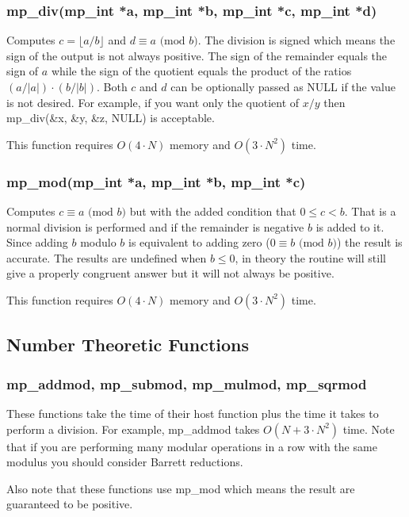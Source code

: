 \documentclass{article}
\begin{document}
\subsubsection{mp\_div(mp\_int *a, mp\_int *b, mp\_int *c, mp\_int *d)}
Computes $c = \lfloor a/b \rfloor$ and $d \equiv a \mbox{ (mod }b\mbox{)}$.  The division is signed which means the sign
of the output is not always positive.  The sign of the remainder equals the sign of $a$ while the sign of the 
quotient equals the product of the ratios $(a/\vert a \vert) \cdot (b/\vert b \vert)$.  Both $c$ and $d$ can be 
optionally passed as NULL if the value is not desired.  For example, if you want only the quotient of $x/y$ then 
mp\_div(\&x, \&y, \&z, NULL) is acceptable.

This function requires $O(4 \cdot N)$ memory and $O(3 \cdot N^2)$ time.

\subsubsection{mp\_mod(mp\_int *a, mp\_int *b, mp\_int *c)}
Computes $c \equiv a \mbox{ (mod }b\mbox{)}$ but with the added condition that $0 \le c < b$.  That is a normal 
division is performed and if the remainder is negative $b$ is added to it.  Since adding $b$ modulo $b$ is equivalent
to adding zero ($0 \equiv b \mbox{ (mod }b\mbox{)}$) the result is accurate.  The results are undefined 
when $b \le 0$, in theory the routine will still give a properly congruent answer but it will not always be positive. 

This function requires $O(4 \cdot N)$ memory and $O(3 \cdot N^2)$ time.

\subsection{Number Theoretic Functions}

\subsubsection{mp\_addmod, mp\_submod, mp\_mulmod, mp\_sqrmod}
These functions take the time of their host function plus the time it takes to perform a division.  For example, 
mp\_addmod takes $O(N + 3 \cdot N^2)$ time.  Note that if you are performing many modular operations in a row with
the same modulus you should consider Barrett reductions.  

Also note that these functions use mp\_mod which means the result are guaranteed to be positive.
\end{document}
